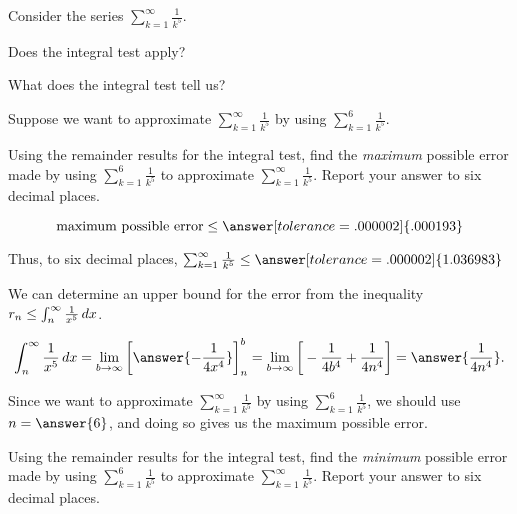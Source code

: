 \documentclass{ximera}
\author{Jim Talamo}
\begin{document}
\begin{exercise}

Consider the series $\sum_{k=1}^{\infty} \frac{1}{k^5}$.  

Does the integral test apply?

\begin{multipleChoice}
\end{multipleChoice}

What does the integral test tell us?
\begin{multipleChoice}
\end{multipleChoice}

Suppose we want to approximate $\sum_{k=1}^{\infty} \frac{1}{k^5}$ by using $\sum_{k=1}^{6} \frac{1}{k^5}$.  

\begin{exercise}
Using the remainder results for the integral test, find the \emph{maximum} possible error made by using $\sum_{k=1}^{6} \frac{1}{k^5}$ to approximate $\sum_{k=1}^{\infty} \frac{1}{k^5}$.  Report your answer to six decimal places.

\[
\textrm{maximum possible error} \leq \answer[tolerance=.000002]{.000193}
\]


Thus, to six decimal places, $\sum_{k=1}^{\infty} \frac{1}{k^5} \leq \answer[tolerance=.000002]{1.036983}$

\begin{hint}
We can determine an upper bound for the error from the inequality $ r_n \leq \int_{n}^{\infty} \frac{1}{x^5} \mathop{}\!d x$. 

\[
\int_n^\infty \frac{1}{x^5} \d x = \lim_{b \to \infty} \eval{\answer{-\frac{1}{4x^4}}}_n^b = \lim_{b \to \infty} \eval{-\frac{1}{4b^4}+\frac{1}{4n^4}} =\answer{\frac{1}{4n^4}}. 
\]

Since we want to approximate $\sum_{k=1}^{\infty} \frac{1}{k^5}$ by using $\sum_{k=1}^{6} \frac{1}{k^5}$, we should use $n=\answer{6}$, and doing so gives us the maximum possible error.
\end{hint}
\end{exercise}

\begin{exercise}
Using the remainder results for the integral test, find the \emph{minimum} possible error made by using $\sum_{k=1}^{6} \frac{1}{k^5}$ to approximate $\sum_{k=1}^{\infty} \frac{1}{k^5}$.  Report your answer to six decimal places.


\end{exercise}
\end{exercise}
\end{document}

